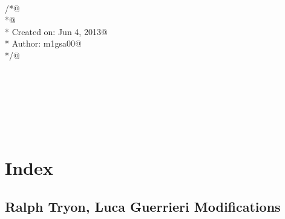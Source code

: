 \documentclass[12pt]{article}
\begin{document}
\begin{flushleft}
\begin{minipage}{\linewidth}
\begin{list}{}{}
\mbox{}\verb@@\\
\mbox{}\verb@/*@\\
\mbox{}\verb@ *@\\
\mbox{}\verb@ *  Created on: Jun 4, 2013@\\
\mbox{}\verb@ *      Author: m1gsa00@\\
\mbox{}\verb@ */@\\
\mbox{}\verb@@\\
\mbox{}\verb@@\\
\mbox{}\verb@@\\
\mbox{}\verb@@\\
\mbox{}\verb@@\\
\mbox{}\verb@@\\
\mbox{}\verb@@{\NWsep}
\end{list}
\vspace{-1.5ex}
\footnotesize
\begin{list}{}{\setlength{\itemsep}{-\parsep}\setlength{\itemindent}{-\leftmargin}}

\item{}
\end{list}
\end{minipage}\vspace{4ex}
\end{flushleft}
\appendix

\section{Index}
\label{sec:index}

\subsection{Ralph Tryon, Luca Guerrieri Modifications}
\label{sec:ralph-tryon-modif}
\end{document}
